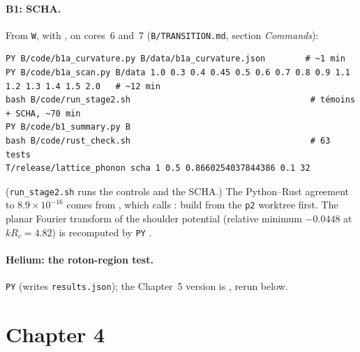 \paragraph{B1: SCHA.} From \texttt{W}, with , on cores~6 and~7
(\texttt{B/TRANSITION.md}, section \emph{Commands}):
\begin{lstlisting}[style=appC,language={}]
PY B/code/b1a_curvature.py B/data/b1a_curvature.json        # ~1 min
PY B/code/b1a_scan.py B/data 1.0 0.3 0.4 0.45 0.5 0.6 0.7 0.8 0.9 1.1 1.2 1.3 1.4 1.5 2.0   # ~12 min
bash B/code/run_stage2.sh                                    # témoins + SCHA, ~70 min
PY B/code/b1_summary.py B
bash B/code/rust_check.sh                                    # 63 tests
T/release/lattice_phonon scha 1 0.5 0.8660254037844386 0.1 32
\end{lstlisting}
(\texttt{run\_stage2.sh} runs the controls and the SCHA.) The Python--Rust agreement to $8.9\times10^{-16}$ comes from
, which calls : build
from the \texttt{p2} worktree first. The planar Fourier transform of the shoulder potential (relative minimum $-0.0448$
at $kR_c=4.82$) is recomputed by \texttt{PY} .

\paragraph{Helium: the roton-region test.} \texttt{PY} 
(writes \texttt{results.json}); the Chapter~5 version is , rerun below.

\section{Chapter 4}\label{appE:sec:ch4}

